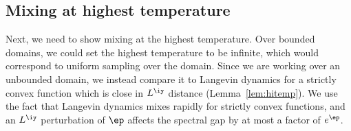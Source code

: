 %

\subsection{Mixing at highest temperature}
\label{sec:mixht}
Next, we need to show mixing at the highest temperature. Over bounded domains, we could set the highest temperature to be infinite, which would correspond to uniform sampling over the domain. Since we are working over an unbounded domain, we instead compare it to Langevin dynamics for a strictly convex function which is close in $L^\iy$ distance (Lemma~\ref{lem:hitemp}). We use the fact that 
Langevin dynamics mixes rapidly for strictly convex functions, and an $L^{\iy}$ perturbation of $\ep$ affects the spectral gap by at most a factor of $e^{\ep}$. 



